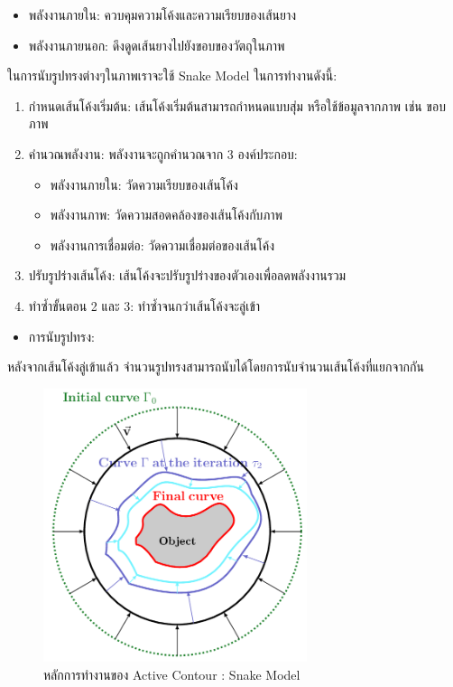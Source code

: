 \begin{itemize}
  \item {พลังงานภายใน: ควบคุมความโค้งและความเรียบของเส้นยาง}
  \item {พลังงานภายนอก: ดึงดูดเส้นยางไปยังขอบของวัตถุในภาพ}
\end{itemize}

ในการนับรูปทรงต่างๆในภาพเราจะใช้  Snake Model ในการทำงานดังนี้:

\begin{enumerate}
  \item {กำหนดเส้นโค้งเริ่มต้น: เส้นโค้งเริ่มต้นสามารถกำหนดแบบสุ่ม หรือใช้ข้อมูลจากภาพ เช่น ขอบภาพ}
  \item {คำนวณพลังงาน: พลังงานจะถูกคำนวณจาก 3 องค์ประกอบ:}
  \begin{itemize}
  \item {พลังงานภายใน: วัดความเรียบของเส้นโค้ง}
  \item {พลังงานภาพ: วัดความสอดคล้องของเส้นโค้งกับภาพ}
  \item {พลังงานการเชื่อมต่อ: วัดความเชื่อมต่อของเส้นโค้ง}
  \end{itemize}
  \item {ปรับรูปร่างเส้นโค้ง: เส้นโค้งจะปรับรูปร่างของตัวเองเพื่อลดพลังงานรวม}
  \item {ทำซ้ำขั้นตอน 2 และ 3: ทำซ้ำจนกว่าเส้นโค้งจะลู่เข้า}
\end{enumerate}

\begin{itemize}
  \item {การนับรูปทรง:}
\end{itemize}

หลังจากเส้นโค้งลู่เข้าแล้ว จำนวนรูปทรงสามารถนับได้โดยการนับจำนวนเส้นโค้งที่แยกจากกัน

\begin{figure}[h!]
  \begin{center}
    \includegraphics[height=8cm]{2_6.png}
  \end{center}
  \caption[Poem]{หลักการทำงานของ Active Contour : Snake Model}
\end{figure}

